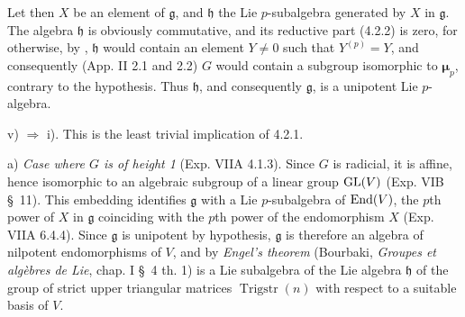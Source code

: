 Let then $X$ be an element of $\mathfrak g$, and $\mathfrak h$ the Lie $p$-subalgebra generated by $X$ in $\mathfrak g$. The algebra $\mathfrak h$ is obviously commutative, and its reductive part (4.2.2) is zero, for otherwise, by \loccit, $\mathfrak h$ would contain an element $Y\neq0$ such that $Y^{(p)}=Y$, and consequently (App. II 2.1 and 2.2) $G$ would contain a subgroup isomorphic to $\boldsymbol\mu_p$, contrary to the hypothesis. Thus $\mathfrak h$, and consequently $\mathfrak g$, is a unipotent Lie $p$-algebra.

\noindent v) $\Rightarrow$ i). This is the least trivial implication of 4.2.1.

\noindent a) \emph{Case where $G$ is of height 1} (Exp. VIIA 4.1.3). Since $G$ is radicial, it is affine, hence isomorphic to an algebraic subgroup of a linear group $\operatorname{GL}(V)$ (Exp. VIB \S~11). This embedding identifies $\mathfrak g$ with a Lie $p$-subalgebra of $\operatorname{End}(V)$, the $p$th power of $X$ in $\mathfrak g$ coinciding with the $p$th power of the endomorphism $X$ (Exp. VIIA 6.4.4). Since $\mathfrak g$ is unipotent by hypothesis, $\mathfrak g$ is therefore an algebra of nilpotent endomorphisms of $V$, and by \emph{Engel's theorem} (Bourbaki, \emph{Groupes et algèbres de Lie}, chap. I \S~4 th. 1) is a Lie subalgebra of the Lie algebra $\mathfrak h$ of the group of strict upper triangular matrices $\operatorname{Trigstr}(n)$ with respect to a suitable basis of $V$.

